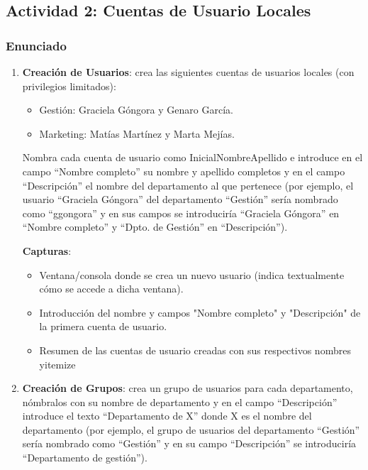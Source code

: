\subsection{Actividad 2: Cuentas de Usuario Locales}

\subsubsection{Enunciado}

\begin{enumerate}[label=2.\alph*)]
    \item \textbf{Creación de Usuarios}: crea las siguientes cuentas de usuarios locales (con privilegios limitados):
    \begin{itemize}
        \item Gestión: Graciela Góngora y Genaro García.
        \item Marketing: Matías Martínez y Marta Mejías.
    \end{itemize}

    Nombra cada cuenta de usuario como InicialNombreApellido e introduce en el campo ``Nombre completo'' su nombre y apellido completos y en el campo ``Descripción'' el nombre del departamento al que pertenece (por ejemplo, el usuario ``Graciela Góngora'' del departamento ``Gestión'' sería nombrado como ``ggongora'' y en sus campos se introduciría ``Graciela Góngora'' en ``Nombre completo'' y ``Dpto. de Gestión'' en ``Descripción'').

    \textbf{Capturas}:
    \begin{itemize}
        \item Ventana/consola donde se crea un nuevo usuario (indica textualmente cómo se accede a dicha ventana).
        \item Introducción del nombre y campos "Nombre completo" y "Descripción" de la primera cuenta de usuario.
        \item Resumen de las cuentas de usuario creadas con sus respectivos nombres yitemize
    \end{itemize}

    \item \textbf{Creación de Grupos}: crea un grupo de usuarios para cada departamento, nómbralos con su nombre de departamento y en el campo ``Descripción'' introduce el texto ``Departamento de X'' donde X es el nombre del departamento (por ejemplo, el grupo de usuarios del departamento ``Gestión'' sería nombrado como ``Gestión'' y en su campo ``Descripción'' se introduciría ``Departamento de gestión'').


\end{enumerate}
